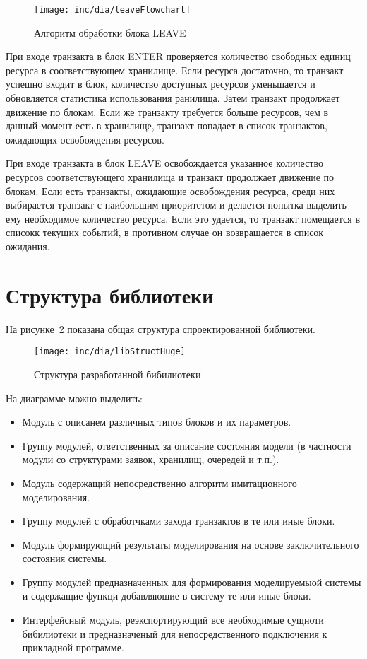 \begin{figure}[ht]
  \centering
  \texttt{[image: inc/dia/leaveFlowchart]}
  \caption{Алгоритм обработки блока LEAVE}
  \label{fig:leaveFlowchart}
\end{figure}

При входе транзакта в блок ENTER проверяется количество свободных единиц ресурса в соответствующем хранилище. Если ресурса достаточно, то транзакт успешно входит в блок, количество доступных ресурсов уменьшается и обновляется статистика использования ранилища. Затем транзакт продолжает движение по блокам. Если же транзакту требуется больше ресурсов, чем в данный момент есть в хранилище, транзакт попадает в список транзактов, ожидающих освобождения ресурсов.

При входе транзакта в блок LEAVE освобождается указанное количество ресурсов соответствующего хранилища и транзакт продолжает движение по блокам. Если есть транзакты, ожидающие освобождения ресурса, среди них выбирается транзакт с наибольшим приоритетом и делается попытка выделить ему необходимое количество ресурса. Если это удается, то транзакт помещается в списокк текущих событий, в противном случае он возвращается в список ожидания.

\section{Структура библиотеки}

На рисунке~\ref{fig:libStruct} показана общая структура спроектированной библиотеки.

\begin{figure}[ht]
  \centering
  \texttt{[image: inc/dia/libStructHuge]}
  \caption{Структура разработанной бибилиотеки}
  \label{fig:libStruct}
\end{figure}

На диаграмме можно выделить:

\begin{itemize}
\item {Модуль с описанем различных типов блоков и их параметров.}
\item {Группу модулей, ответственных за описание состояния модели (в частности модули со структурами заявок, хранилищ, очередей и т.п.).}
\item {Модуль содержащий непосредственно алгоритм имитационного моделирования.}
\item {Группу модулей с обработчками захода транзактов в те или иные блоки.}
\item {Модуль формирующий результаты моделирования на основе заключительного состояния системы.}
\item {Группу модулей предназначенных для формирования моделируемыой системы и содержащие функци добавляющие в систему те или иные блоки.}
\item {Интерфейсный модуль, реэкспортирующий все необходимые сущноти бибилиотеки и предназначеный для непосредственного подключения к прикладной программе.}

\end{itemize}

